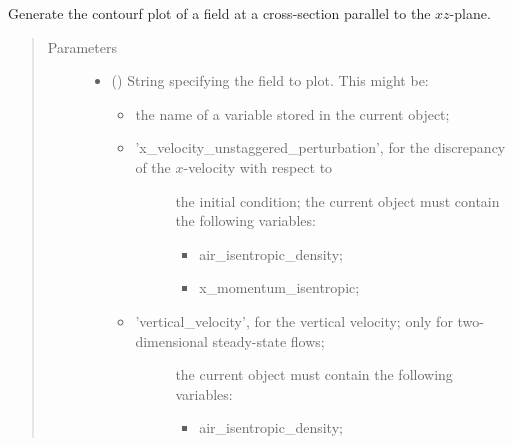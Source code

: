 \documentclass[letterpaper,10pt,english]{sphinxmanual}
\begin{document}
\begin{fulllineitems}
\begin{fulllineitems}
\begin{quote}
\begin{description}
\begin{itemize}
\end{itemize}

\end{description}\end{quote}

\end{fulllineitems}


\begin{fulllineitems}
\label{\detokenize{api:storages.state_isentropic.StateIsentropic.contourf_xz}}
Generate the contourf plot of a field at a cross-section parallel to the \(xz\)-plane.
\begin{quote}\begin{description}
\item[{Parameters}] \leavevmode\begin{itemize}
\item {} 
 () \textendash{} 
String specifying the field to plot. This might be:
\begin{itemize}
\item {} 
the name of a variable stored in the current object;

\item {} \begin{description}
\item[{’x\_velocity\_unstaggered\_perturbation’, for the discrepancy of the \(x\)-velocity with respect to}] \leavevmode
the initial condition; the current object must contain the following variables:
\begin{itemize}
\item {} 
air\_isentropic\_density;

\item {} 
x\_momentum\_isentropic;

\end{itemize}

\end{description}

\item {} \begin{description}
\item[{’vertical\_velocity’, for the vertical velocity; only for two-dimensional steady-state flows;}] \leavevmode
the current object must contain the following variables:
\begin{itemize}
\item {} 
air\_isentropic\_density;


\end{itemize}
\end{description}
\end{itemize}
\end{itemize}
\end{description}
\end{quote}
\end{fulllineitems}
\end{fulllineitems}
\end{document}
